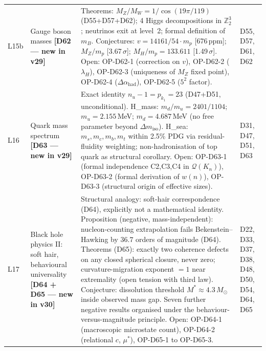 \documentclass[11pt,a4paper]{article}
\theoremstyle{plain}
\theoremstyle{definition}
\theoremstyle{remark}
\begin{document}
\begin{longtable}{L{0.6cm}L{3.0cm}L{5.5cm}L{4.0cm}}
L15b & Gauge boson masses \textbf{[D62 --- new in v29]} & \textcolor{proofblue}{Theorems}: $M_Z/M_W = 1/\cos(19\pi/119)$ (D55+D57+D62); 4 Higgs decompositions in $\mathbb{Z}_2^3$; neutrinos exit at level~2; formal definition of $m_B$. \textcolor{conjecturegreen}{Conjectures}: $v = 14161/54\cdot m_p$ [676\,ppm]; $M_Z/m_p$ [3.67\,$\sigma$]; $M_H/m_p = 133.611$ [1.49\,$\sigma$]. Open: OP-D62-1 (correction on $v$), OP-D62-2 ($\lambda_H$), OP-D62-3 (uniqueness of $M_Z$ fixed point), OP-D62-4 ($\Delta\alpha_{\mathrm{had}}$), OP-D62-5 ($5^2$ factor). & D55, D57, D61, D62\\[0.3em]
L16 & Quark mass spectrum \textbf{[D63 --- new in v29]} & Exact identity $n_u - 1 = p_{k_1} = 23$ (D47+D51, \textcolor{proofblue}{unconditional}). \textcolor{conjecturegreen}{H\_mass}: $m_d/m_u = 2401/1104$; $m_u = 2.155$\,MeV; $m_d = 4.687$\,MeV (no free parameter beyond $\Delta m_{\mathrm{iso}}$). \textcolor{conjecturegreen}{H\_sea}: $m_s, m_c, m_b, m_t$ within 2.5\% PDG via residual-fluidity weighting; non-hadronisation of top quark as structural corollary. Open: OP-D63-1 (formal independence C2,C3,C4 in $\mathcal{Q}(K_n)$), OP-D63-2 (formal derivation of $w(n)$), OP-D63-3 (structural origin of effective sizes). & D31, D47, D51, D63\\[0.3em]
L17 & Black hole physics II: soft hair, behavioural universality \textbf{[D64 + D65 --- new in v30]} & \textcolor{conjecturegreen}{Structural analogy}: soft-hair correspondence (D64), explicitly not a mathematical identity. \textcolor{proofblue}{Proposition} (negative, mass-independent): nucleon-counting extrapolation fails Bekenstein--Hawking by $36.7$ orders of magnitude (D64). \textcolor{proofblue}{Theorems} (D65): exactly two coherence defects on any closed spherical closure, never zero; curvature-migration exponent $=1$ near extremality (open tension with third law). \textcolor{conjecturegreen}{Conjecture}: dissolution threshold $M^*\approx4.3\,M_\odot$ inside observed mass gap. Seven further negative results organised under the behaviour-versus-magnitude principle. Open: OP-D64-1 (macroscopic microstate count), OP-D64-2 (relational $c$, $\mu^*$), OP-D65-1 to OP-D65-3. & D22, D33, D37, D38, D48, D50, D54, D64, D65\\[0.3em]

\end{longtable}
\end{document}
